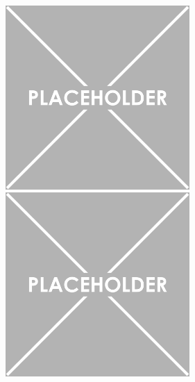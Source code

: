 \documentclass[a4paper, 10pt, openright]{report}
\begin{document}
\begin{figure}[htbp]
 {
\begin{minipage}[b]{.48\textwidth}
\includegraphics[width=7cm, height=7cm]{figs/placeholder.png}
\end{minipage}\hfill
\begin{minipage}[b]{.48\textwidth}
\includegraphics[width=7cm, height=7cm]{figs/placeholder.png}
\end{minipage} \hfill
}
\end{figure}
\end{document}
